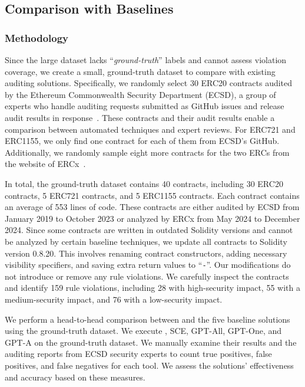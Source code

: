 

\subsection{Comparison with Baselines}
\label{sec:compare}


\subsubsection{Methodology}
Since the large dataset lacks ``\emph{ground-truth}'' 
labels and 
cannot assess violation coverage, we 
create a small, ground-truth dataset to compare \Tool{} with existing auditing solutions.
Specifically, we randomly select 30 ERC20 contracts 
audited by the Ethereum Commonwealth Security 
Department (ECSD), a group of experts who handle auditing requests 
submitted as GitHub issues and release audit results in response~\cite{humanaudited}. 
These contracts and their audit results enable a comparison between automated techniques
and expert reviews. 
%
For ERC721 and ERC1155, we only find one contract for each of them from ECSD's GitHub. Additionally, 
we randomly sample eight more contracts for the two ERCs 
from the website of ERCx~\cite{ERCx}.

In total, the ground-truth dataset contains 40 contracts, including 30 ERC20 contracts, 5 ERC721 contracts, and 5 ERC1155 contracts. Each contract contains an average of 553 lines of code. 
These contracts are either audited by ECSD from January 2019 
to October 2023
or analyzed by ERCx 
from May 2024 to December 2024. 
Since some contracts are written in 
outdated Solidity versions and cannot be analyzed by certain baseline 
techniques, we update all contracts to Solidity version 0.8.20. 
This involves renaming contract constructors, adding necessary visibility specifiers, 
and 
saving extra return values to ``\texttt{-}''.
Our modifications do not introduce or remove any rule violations. 
We carefully inspect the contracts and 
identify 159 rule violations, including 28 with high-security impact, 55 with a 
medium-security impact, and 76 with a low-security impact.





We perform a head-to-head comparison between \Tool{}
and the five baseline solutions using the ground-truth dataset.
We execute \Tool{}, SCE, GPT-All, GPT-One, and GPT-A 
on the ground-truth dataset.
We manually examine their results and the auditing reports 
from ECSD security experts
to count true positives, false positives, 
and false negatives for each tool.
We assess the solutions’ effectiveness 
and accuracy based on these measures.



